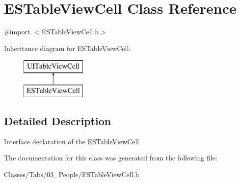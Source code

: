 \hypertarget{interface_e_s_table_view_cell}{}\section{E\+S\+Table\+View\+Cell Class Reference}
\label{interface_e_s_table_view_cell}


{\ttfamily \#import $<$E\+S\+Table\+View\+Cell.\+h$>$}

Inheritance diagram for E\+S\+Table\+View\+Cell\+:\begin{figure}[H]
\begin{center}
\leavevmode
\includegraphics[height=2.000000cm]{interface_e_s_table_view_cell}
\end{center}
\end{figure}


\subsection{Detailed Description}
Interface declaration of the \hyperlink{interface_e_s_table_view_cell}{E\+S\+Table\+View\+Cell} 

The documentation for this class was generated from the following file\+:\begin{DoxyCompactItemize}
\item 
Classes/\+Tabs/03\+\_\+\+People/E\+S\+Table\+View\+Cell.\+h\end{DoxyCompactItemize}
